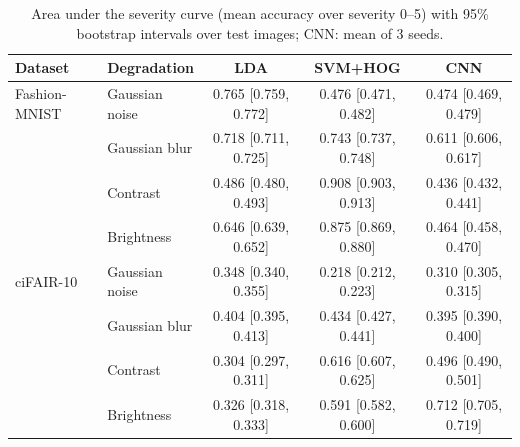 \begin{table}[t]
\centering
\caption{Area under the severity curve (mean accuracy over severity 0--5) with 95\% bootstrap intervals over test images; CNN: mean of 3 seeds.}
\label{tab:ausc}
\small
\begin{tabular}{llccc}
\toprule
Dataset & Degradation & LDA & SVM+HOG & CNN \\
\midrule
Fashion-MNIST & Gaussian noise & 0.765 [0.759, 0.772] & 0.476 [0.471, 0.482] & 0.474 [0.469, 0.479] \\
 & Gaussian blur & 0.718 [0.711, 0.725] & 0.743 [0.737, 0.748] & 0.611 [0.606, 0.617] \\
 & Contrast & 0.486 [0.480, 0.493] & 0.908 [0.903, 0.913] & 0.436 [0.432, 0.441] \\
 & Brightness & 0.646 [0.639, 0.652] & 0.875 [0.869, 0.880] & 0.464 [0.458, 0.470] \\
\midrule
ciFAIR-10 & Gaussian noise & 0.348 [0.340, 0.355] & 0.218 [0.212, 0.223] & 0.310 [0.305, 0.315] \\
 & Gaussian blur & 0.404 [0.395, 0.413] & 0.434 [0.427, 0.441] & 0.395 [0.390, 0.400] \\
 & Contrast & 0.304 [0.297, 0.311] & 0.616 [0.607, 0.625] & 0.496 [0.490, 0.501] \\
 & Brightness & 0.326 [0.318, 0.333] & 0.591 [0.582, 0.600] & 0.712 [0.705, 0.719] \\
\bottomrule
\end{tabular}
\end{table}
